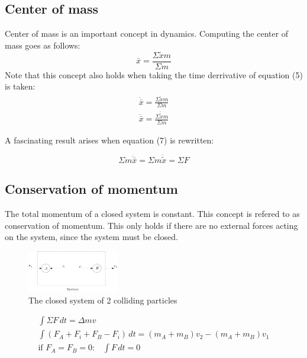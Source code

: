 \documentclass[11pt, a4paper]{article}
\begin{document}
\subsection{Center of mass}
Center of mass is an important concept in dynamics. Computing the center of mass goes as follows:
\begin{equation}
  \bar{x} = \frac{\Sigma \tilde{x}m}{\Sigma m}
\end{equation}
Note that this concept also holds when taking the time derrivative of equation (5) is taken:
\begin{gather}
  \dot{\bar{x}} = \frac{\Sigma \dot{\tilde{x}}m}{\Sigma m}\\
  \ddot{\bar{x}} = \frac{\Sigma \ddot{\tilde{x}}m}{\Sigma m}
\end{gather}

A fascinating result arises when equation (7) is rewritten:

\begin{equation}
  \Sigma m \ddot{\bar{x}} = \Sigma m\ddot{\tilde{x}} = \Sigma F
\end{equation}

\subsection{Conservation of momentum}
The total momentum of a closed system is constant. This concept is refered to as conservation of momentum.
This only holds if there are no external forces acting on the system, since the system must be closed.

\begin{figure}[h]
  \centerline{\includegraphics[width=40mm]{images/system.png}}
  \caption{The closed system of 2 colliding particles}
\end{figure}

\begin{gather}
  \int \Sigma F\,dt = \Delta mv\\
  \int (F_A + F_i + F_B - F_i)\,dt = (m_A+m_B)v_2 - (m_A+m_B)v_1\\
  \text{if $F_A = F_B = 0$:} \quad \int F\,dt = 0
\end{gather}
\end{document}
